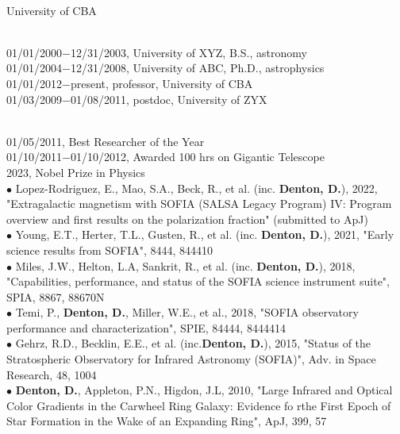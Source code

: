 %
\\
University of CBA
\par \vspace{-0.5em}
\\
01/01/2000$-$12/31/2003, University of XYZ, B.S., astronomy\\
01/01/2004$-$12/31/2008, University of ABC, Ph.D., astrophysics
\mySectionSpacing
{}\\
01/01/2012$-$present, professor, University of CBA\\
01/03/2009$-$01/08/2011, postdoc, University of ZYX
\par \vspace{-0.5em}
\\
01/05/2011, Best Researcher of the Year\\
01/10/2011$-$01/10/2012, Awarded 100 hrs on Gigantic Telescope\\
2023, Nobel Prize in Physics
\mySectionSpacing
{}\\
{\scriptsize{$\bullet$}} Lopez-Rodriguez, E., Mao, S.A., Beck, R., et al. (inc. \textbf{Denton, D.}), 2022, "Extragalactic magnetism with SOFIA (SALSA Legacy Program) IV: Program overview and first results on the polarization fraction" (submitted to ApJ)\\
{\scriptsize{$\bullet$}} Young, E.T., Herter, T.L., Gusten, R., et al. (inc. \textbf{Denton, D.}), 2021, "Early science results from SOFIA", 8444, 844410\\
{\scriptsize{$\bullet$}} Miles, J.W., Helton, L.A, Sankrit, R., et al. (inc. \textbf{Denton, D.}), 2018, "Capabilities, performance, and status of the SOFIA science instrument suite", SPIA, 8867, 88670N\\
{\scriptsize{$\bullet$}} Temi, P., \textbf{Denton, D.}, Miller, W.E., et al., 2018, "SOFIA observatory performance and characterization", SPIE, 84444, 8444414\\
{\scriptsize{$\bullet$}} Gehrz, R.D., Becklin, E.E., et al. (inc.\textbf{Denton, D.}), 2015, "Status of the Stratospheric Observatory for Infrared Astronomy (SOFIA)", Adv. in Space Research, 48, 1004\\
{\scriptsize{$\bullet$}} \textbf{Denton, D.}, Appleton, P.N., Higdon, J.L, 2010, "Large Infrared and Optical Color Gradients in the Carwheel Ring Galaxy: Evidence fo rthe First Epoch of Star Formation in the Wake of an Expanding Ring", ApJ, 399, 57
